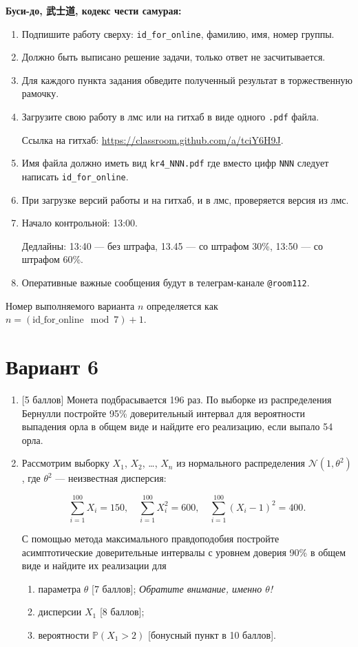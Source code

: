 \documentclass[12pt]{article}
\def \cN{\mathcal{N}}
\def \P{\mathbb{P}}
\newcommand \id {\mathrm{id}\_\mathrm{for}\_\mathrm{online}}
\begin{document}
\textbf{Буси-до, 武士道, кодекс чести самурая:}

\vspace{5mm}

\begin{enumerate}
\item Подпишите работу сверху: \verb|id_for_online|, фамилию, имя, номер группы.
\item Должно быть выписано решение задачи, только ответ не засчитывается.
\item Для каждого пункта задания обведите полученный результат в торжественную рамочку.
\item Загрузите свою работу в лмс или на гитхаб в виде одного \verb|.pdf| файла.

Ссылка на гитхаб: \url{https://classroom.github.com/a/tciY6H9J}.
\item Имя файла должно иметь вид \verb|kr4_NNN.pdf| где вместо цифр \verb|NNN| следует написать \verb|id_for_online|.
\item При загрузке версий работы и на гитхаб, и в лмс, проверяется версия из лмс. 
\item Начало контрольной: 13:00. 

Дедлайны: 13:40 — без штрафа, 13.45 — со штрафом 30\%, 13:50 — со штрафом 60\%.
\item Оперативные важные сообщения будут в телеграм-канале \verb|@room112|.
\end{enumerate}


\newpage
Номер выполняемого варианта $n$ определяется как $n=(\id \mod 7)+1$. 

\section*{Вариант 6}


\begin{enumerate}

\item {[5 баллов]} Монета подбрасывается 196 раз. По выборке из распределения Бернулли
постройте 95\% доверительный интервал для вероятности выпадения орла в общем виде и найдите его
реализацию, если выпало 54 орла.

\item Рассмотрим выборку $X_1$, $X_2$, \ldots, $X_n$ из нормального распределения $\cN(1, \theta^2)$, 
где $\theta^2$ — неизвестная дисперсия:

\[
\sum_{i=1}^{100} X_i = 150, \quad \sum_{i=1}^{100} X_i^2 = 600, \quad \sum_{i=1}^{100} (X_i - 1)^2 = 400.  
\]

С помощью метода максимального правдоподобия 
постройте асимптотические доверительные интервалы с уровнем доверия 90\% в общем виде и найдите их реализации для  

\begin{enumerate}
\item параметра $\theta$ {[7 баллов]}; \textit{Обратите внимание, именно $\theta$!}
\item дисперсии $X_1$ {[8 баллов]};
\item вероятности $\P(X_1 > 2)$ {[бонусный пункт в 10 баллов]}.
\end{enumerate}

\end{enumerate}
\end{document}

